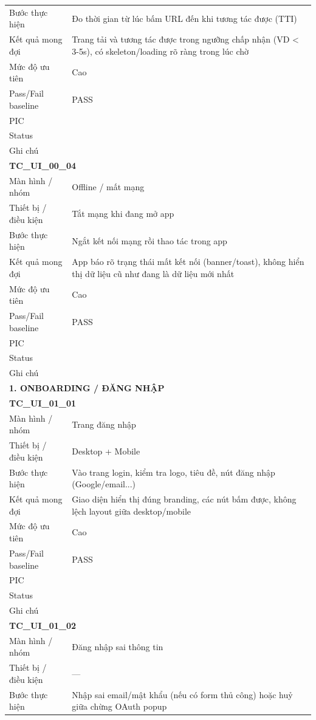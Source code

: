 \documentclass[12pt,a4paper]{article}
\begin{document}
\begin{longtable}{p{3.0cm}p{11.5cm}}
Bước thực hiện & Đo thời gian từ lúc bấm URL đến khi tương tác được (TTI) \\
Kết quả mong đợi & Trang tải và tương tác được trong ngưỡng chấp nhận (VD < 3-5s), có skeleton/loading rõ ràng trong lúc chờ \\
Mức độ ưu tiên & Cao \\
Pass/Fail baseline & PASS \\
PIC &  \\
Status &  \\
Ghi chú &  \\
\midrule
\multicolumn{2}{l}{\textbf{TC\_UI\_00\_04}} \\
Màn hình / nhóm & Offline / mất mạng \\
Thiết bị / điều kiện & Tắt mạng khi đang mở app \\
Bước thực hiện & Ngắt kết nối mạng rồi thao tác trong app \\
Kết quả mong đợi & App báo rõ trạng thái mất kết nối (banner/toast), không hiển thị dữ liệu cũ như đang là dữ liệu mới nhất \\
Mức độ ưu tiên & Cao \\
Pass/Fail baseline & PASS \\
PIC &  \\
Status &  \\
Ghi chú &  \\
\midrule
\multicolumn{2}{l}{\textbf{1. ONBOARDING / ĐĂNG NHẬP}} \\ \midrule
\multicolumn{2}{l}{\textbf{TC\_UI\_01\_01}} \\
Màn hình / nhóm & Trang đăng nhập \\
Thiết bị / điều kiện & Desktop + Mobile \\
Bước thực hiện & Vào trang login, kiểm tra logo, tiêu đề, nút đăng nhập (Google/email...) \\
Kết quả mong đợi & Giao diện hiển thị đúng branding, các nút bấm được, không lệch layout giữa desktop/mobile \\
Mức độ ưu tiên & Cao \\
Pass/Fail baseline & PASS \\
PIC &  \\
Status &  \\
Ghi chú &  \\
\midrule
\multicolumn{2}{l}{\textbf{TC\_UI\_01\_02}} \\
Màn hình / nhóm & Đăng nhập sai thông tin \\
Thiết bị / điều kiện & — \\
Bước thực hiện & Nhập sai email/mật khẩu (nếu có form thủ công) hoặc huỷ giữa chừng OAuth popup \\

\end{longtable}
\end{document}
